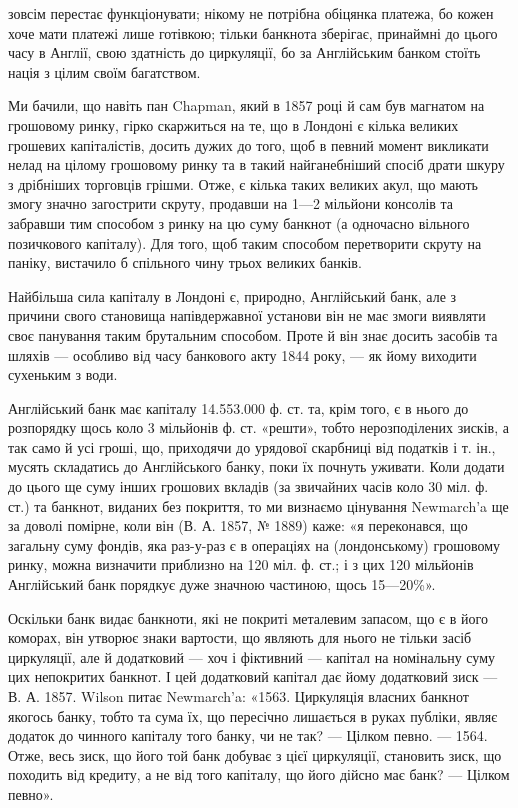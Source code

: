 \parcont{}  %
зовсім перестає функціонувати; нікому не потрібна обіцянка платежа, бо кожен
хоче мати платежі лише готівкою; тільки банкнота зберігає, принаймні до цього
часу в Англії, свою здатність до циркуляції, бо за Англійським банком стоїть
нація з цілим своїм багатством.

Ми бачили, що навіть пан Chapman, який в 1857 році й сам був магнатом
на грошовому ринку, гірко скаржиться на те, що в Лондоні є кілька великих
грошевих капіталістів, досить дужих до того, щоб в певний момент викликати
нелад на цілому грошовому ринку та в такий найганебніший спосіб драти шкуру
з дрібніших торговців грішми. Отже, є кілька таких великих акул, що мають
змогу значно загострити скруту, продавши на 1—2 мільйони консолів та забравши
тим способом з ринку на цю суму банкнот (а одночасно вільного позичкового
капіталу). Для того, щоб таким способом перетворити скруту на паніку,
вистачило б спільного чину трьох великих банків.

Найбільша сила капіталу в Лондоні є, природно, Англійський банк, але
з причини свого становища напівдержавної установи він не має змоги виявляти
своє панування таким брутальним способом. Проте й він знає досить засобів
та шляхів — особливо від часу банкового акту 1844 року, — як йому виходити
сухеньким з води.

Англійський банк має капіталу 14.553.000 ф. ст. та, крім того, є в нього
до розпорядку щось коло 3 мільйонів ф. ст. «решти», тобто нерозподілених зисків,
а так само й усі гроші, що, приходячи до урядової скарбниці від податків
і т. ін., мусять складатись до Англійського банку, поки їх почнуть уживати.
Коли додати до цього ще суму інших грошових вкладів (за звичайних часів
коло 30 міл. ф. ст.) та банкнот, виданих без покриття, то ми визнаємо цінування
Newmarch’a ще за доволі помірне, коли він (В. А. 1857, № 1889)
каже: «я переконався, що загальну суму фондів, яка раз-у-раз є в операціях
на (лондонському) грошовому ринку, можна визначити приблизно на 120 міл.
ф. ст.; і з цих 120 мільйонів Англійський банк порядкує дуже значною частиною,
щось 15—20\%».

Оскільки банк видає банкноти, які не покриті металевим запасом, що є в його
коморах, він утворює знаки вартости, що являють для нього не тільки засіб циркуляції,
але й додатковий — хоч і фіктивний — капітал на номінальну суму цих непокритих
банкнот. І цей додатковий капітал дає йому додатковий зиск — В. А. 1857.
Wilson питає Newmarch’a: «1563. Циркуляція власних банкнот якогось банку,
тобто та сума їх, що пересічно лишається в руках публіки, являє додаток до
чинного капіталу того банку, чи не так? — Цілком певно. — 1564. Отже, весь
зиск, що його той банк добуває з цієї циркуляції, становить зиск, що походить
від кредиту, а не від того капіталу, що його дійсно має банк? — Цілком певно».

